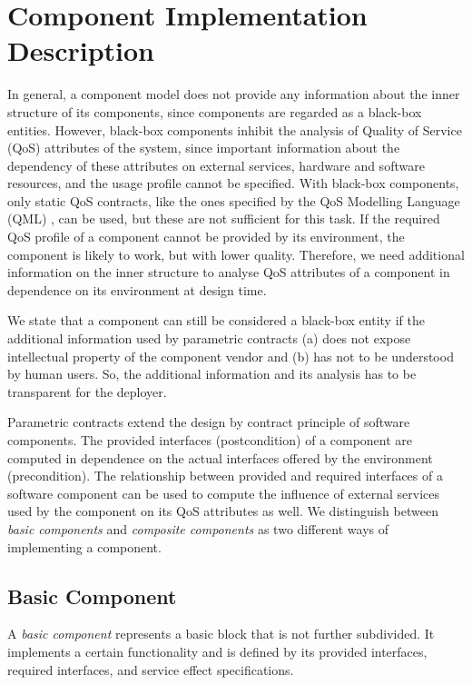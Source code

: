 \section{Component Implementation Description}
\label{sec:ComponentImplementation}

In general, a component model does not provide any information about the inner
structure of its components, since components are regarded as a black-box
entities. However, black-box components inhibit the analysis of Quality of
Service (QoS) attributes of the system, since important information about the
dependency of these attributes on external services, hardware and software
resources, and the usage profile cannot be specified.  With black-box
components, only static QoS contracts, like the ones specified by the QoS
Modelling Language (QML) \cite{frolund1998a}, can be used, but these are not
sufficient for this task. If the required QoS profile of a component cannot be
provided by its environment, the component is likely to work, but with lower
quality. Therefore, we need additional information on the inner
structure to analyse QoS attributes of a component in dependence on its
environment at design time.

We state that a component can still be considered a black-box entity if the additional
information used by parametric contracts (a) does not expose intellectual
property of the component vendor and (b) has not to be understood by human
users. So, the additional information and its analysis has to be transparent
for the deployer. 

Parametric contracts \cite{reussner2002c} extend the design by contract principle of software components. The provided interfaces (postcondition) of a component are computed in dependence on the actual interfaces offered by the environment (precondition). The relationship between provided and required interfaces of a software component can be used to compute the influence of external services used by the component on its QoS attributes as well. We distinguish between \emph{basic components} and \emph{composite components} as two different ways of implementing a component.

\subsection{Basic Component}
A \emph{basic component} represents a basic block that is not further subdivided. It implements a certain functionality and is defined by its provided interfaces, required interfaces, and service effect specifications.

